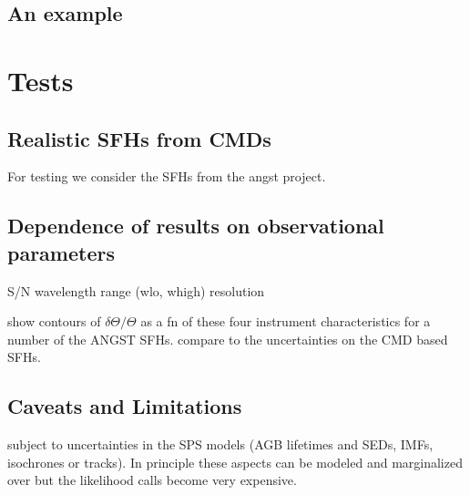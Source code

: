 \subsection{An example}

\section{Tests}

\subsection{Realistic SFHs from CMDs}
For testing we consider the SFHs from the angst project. 

\subsection{Dependence of results on observational parameters}
S/N
wavelength range (wlo, whigh)
resolution

show contours of $\delta \Theta/\Theta$ as a fn of these four instrument characteristics for a number of the ANGST SFHs.  compare to the uncertainties on the CMD based SFHs.

\subsection{Caveats and Limitations}
subject to uncertainties in the SPS models (AGB lifetimes and SEDs, IMFs, isochrones or tracks).  In principle these aspects can be modeled and marginalized over \citep{conroy09} but the likelihood calls become very expensive.